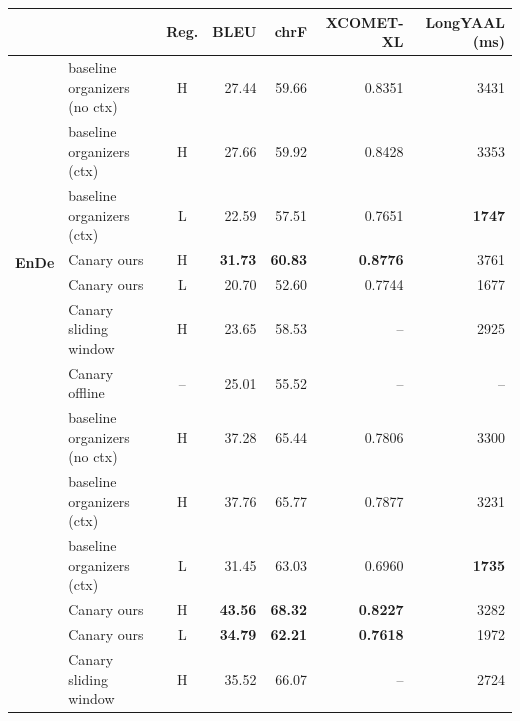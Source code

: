 \documentclass[11pt]{article}
\begin{document}
\begin{table}[t]
    \centering
    \renewcommand{\arraystretch}{1.15}
    \footnotesize
    \begin{tabular}{ll|c|rrrr}
        & & \textbf{Reg.} & \textbf{BLEU} & \textbf{chrF} & \textbf{XCOMET-XL} & \textbf{LongYAAL (ms)} \\
        \hline
        \multirow{8}{*}{\textbf{EnDe}}
        & baseline organizers (no ctx) & H & 27.44 & 59.66 & 0.8351 & 3431 \\
        & baseline organizers (ctx) & H & 27.66 & 59.92 & 0.8428 & 3353 \\
        & baseline organizers (ctx) & L & 22.59 & 57.51 & 0.7651 & \textbf{1747} \\
        & \cellcolor{lightgray}Canary ours & \cellcolor{lightgray}H &
          \cellcolor{lightgray}\textbf{31.73} &
          \cellcolor{lightgray}\textbf{60.83} &
          \cellcolor{lightgray}\textbf{0.8776} &
          \cellcolor{lightgray}3761 \\
        & \cellcolor{lightgray}Canary ours & \cellcolor{lightgray}L &
          \cellcolor{lightgray}20.70 &
          \cellcolor{lightgray}52.60 &
          \cellcolor{lightgray}0.7744 &
          \cellcolor{lightgray}1677 \\
        & Canary sliding window & H & 23.65 & 58.53 & -- & 2925 \\
        & Canary offline & -- & 25.01 & 55.52 & -- & -- \\
        \hline
        \multirow{8}{*}{\textbf{EnIt}}
        & baseline organizers (no ctx) & H & 37.28 & 65.44 & 0.7806 & 3300 \\
        & baseline organizers (ctx) & H & 37.76 & 65.77 & 0.7877 & 3231 \\
        & baseline organizers (ctx) & L & 31.45 & 63.03 & 0.6960 & \textbf{1735} \\
        & \cellcolor{lightgray}Canary ours  & \cellcolor{lightgray}H &
          \cellcolor{lightgray}\textbf{43.56} &
          \cellcolor{lightgray}\textbf{68.32} &
          \cellcolor{lightgray}\textbf{0.8227} &
          \cellcolor{lightgray}3282 \\
        & \cellcolor{lightgray}Canary ours  & \cellcolor{lightgray}L &
          \cellcolor{lightgray}\textbf{34.79} &
          \cellcolor{lightgray}\textbf{62.21} &
          \cellcolor{lightgray}\textbf{0.7618} &
          \cellcolor{lightgray}1972 \\
        & Canary sliding window & H & 35.52 & 66.07 & -- & 2724 \\

\end{tabular}
\end{table}
\end{document}
